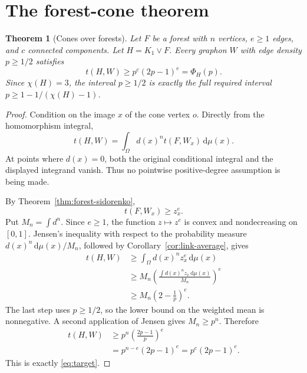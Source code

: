 \documentclass[11pt]{article}
\newtheorem{theorem}{Theorem}[section]
\newcommand{\dd}{\,\mathrm{d}}
\newcommand{\join}{\mathbin{\vee}}
\begin{document}
\section{The forest-cone theorem}

\begin{theorem}[Cones over forests]
\label{thm:main}
Let $F$ be a forest with $n$ vertices, $e\geq1$ edges, and $c$
connected components.  Let $H=K_1\join F$.  Every graphon $W$ with
edge density $p\geq1/2$ satisfies
\[
\boxed{
t(H,W)
\geq p^c(2p-1)^e
=\Phi_H(p).
}
\]
Since $\chi(H)=3$, the interval $p\geq1/2$ is exactly the full required
interval $p\geq1-1/(\chi(H)-1)$.
\end{theorem}

\begin{proof}
Condition on the image $x$ of the cone vertex $o$.  Directly from the
homomorphism integral,
\begin{equation}
t(H,W)
=\int_\Omega d(x)^n t(F,W_x)\dd\mu(x).
\label{eq:link-identity}
\end{equation}
At points where $d(x)=0$, both the original conditional integral and
the displayed integrand vanish.  Thus no pointwise positive-degree
assumption is being made.

By Theorem~\ref{thm:forest-sidorenko},
\[
t(F,W_x)\geq z_x^e.
\]
Put $M_n=\int d^n$.  Since $e\geq1$, the function $z\mapsto z^e$ is
convex and nondecreasing on $[0,1]$.  Jensen's inequality with respect
to the probability measure $d(x)^n\dd\mu(x)/M_n$, followed by
Corollary~\ref{cor:link-average}, gives
\begin{align*}
t(H,W)
&\geq\int_\Omega d(x)^nz_x^e\dd\mu(x)
\\
&\geq
M_n
\left(
\frac{\int d(x)^nz_x\dd\mu(x)}{M_n}
\right)^e
\\
&\geq
M_n\left(2-\frac1p\right)^e.
\end{align*}
The last step uses $p\geq1/2$, so the lower bound on the weighted mean
is nonnegative.  A second application of Jensen gives $M_n\geq p^n$.
Therefore
\begin{align*}
t(H,W)
&\geq
p^n\left(\frac{2p-1}{p}\right)^e
\\
&=p^{n-e}(2p-1)^e
=p^c(2p-1)^e.
\end{align*}
This is exactly \eqref{eq:target}.
\end{proof}


\end{document}
